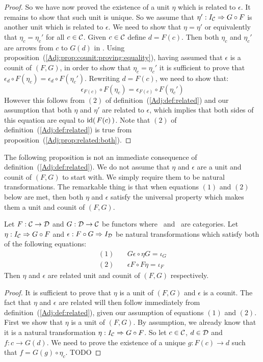 \begin{proof}
    So we have now proved the existence of a unit $\eta$ which is
    related to $\epsilon$. It remains to show that such unit is unique.
    So we assume that $\eta':I_{\cal C}\Rightarrow G\circ F$ is 
    another unit which is related to $\epsilon$. We need to show that
    $\eta=\eta'$ or equivalently that $\eta_{c}=\eta_{c}'$
    for all $c\in\mbox{$\cal C$}$. Given $c\in\mbox{$\cal C$}$ define $d=F(c)$. Then both 
    $\eta_{c}$ and $\eta_{c}'$ are arrows from $c$ to $G(d)$ in
    \Cat. Using proposition~(\ref{Adj:prop:counit:proving:equality}), having
    assumed that $\epsilon$ is a counit of $(F,G)$, in order to show that 
    $\eta_{c}=\eta_{c}'$ it is sufficient to prove that
    $\epsilon_{d}\circ F(\eta_{c})=\epsilon_{d}\circ F(\eta_{c}')$. Rewriting
    $d=F(c)$, we need to show that:
        \[
            \epsilon_{F(c)}\circ F(\eta_{c})=\epsilon_{F(c)}\circ F(\eta_{c}')
        \]
    However this follows from $(2)$ of definition~(\ref{Adj:def:related}) and
    our assumption that both $\eta$ and $\eta'$ are related to $\epsilon$,
    which implies that both sides of this equation are equal to $\mbox{\rm id}(\,F(c)\,)$.
    Note that $(2)$ of definition~(\ref{Adj:def:related}) is true from
    proposition~(\ref{Adj:prop:related:both}).
\end{proof}

The following proposition is not an immediate consequence of 
definition~(\ref{Adj:def:related}). We do not assume that $\eta$ and
$\epsilon$ are a unit and counit of $(F,G)$ to start with. We simply
require them to be natural transformations. The remarkable thing
is that when equations $(1)$ and $(2)$ below are met, then both
$\eta$ and $\epsilon$ satisfy the universal property which makes
them a unit and counit of $(F,G)$.

\begin{prop}\label{Adj:prop:related:just:natural}
    Let $F:\mbox{$\cal C$}\to\mbox{$\cal D$}$ and $G:\mbox{$\cal D$}\to\mbox{$\cal C$}$ be functors where \Cat\ and \Dat\ 
    are categories. Let $\eta:I_{\cal C}\Rightarrow G\circ F$ and 
    $\epsilon:F\circ G\Rightarrow I_{\cal D}$ be natural transformations
    which satisfy both of the following equations:
        \begin{eqnarray*}
            (1)&\ &G\epsilon\circ\eta G=\iota_{G}\\
            (2)&\ &\epsilon F \circ F\eta=\iota_{F}
        \end{eqnarray*}
    Then $\eta$ and $\epsilon$ are related unit and counit of $(F,G)$ respectively.
\end{prop}
\begin{proof}
    It is sufficient to prove that $\eta$ is a unit of $(F,G)$ and $\epsilon$ 
    is a counit. The fact that $\eta$ and $\epsilon$ are related will then 
    follow immediately from  definition~(\ref{Adj:def:related}), given our
    assumption of equations $(1)$ and $(2)$. First we show that $\eta$ is
    a unit of $(F,G)$. By assumption, we already know that it is a natural
    transformation $\eta:I_{\cal C}\Rightarrow G\circ F$. So let $c\in\mbox{$\cal C$}$,
    $d\in\mbox{$\cal D$}$ and $f:c\to G(d)$. We need to prove the existence of a unique
    $g:F(c)\to d$ such that $f=G(g)\circ\eta_{c}$. TODO
\end{proof}
